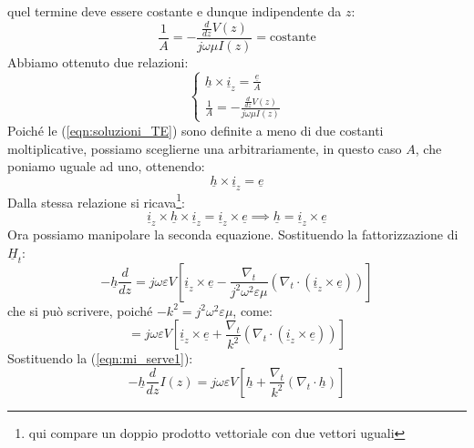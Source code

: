 \documentclass{book}
\begin{document}
        quel termine deve essere costante e dunque indipendente da $z$:
        \begin{equation}
            \frac{1}{A} = \displaystyle -\frac{\frac{d}{dz}V(z)}{j \omega \mu I(z)} =\textrm{costante}
        \end{equation}
        Abbiamo ottenuto due relazioni:
        \begin{equation}
            \begin{cases}
                \displaystyle \underline{h} \times \underline{i}_{z} = \frac{\underline{e}}{A} \\
                \frac{1}{A} = \displaystyle -\frac{\frac{d}{dz}V(z)}{j \omega \mu I(z)}
            \end{cases}
        \end{equation}
        Poiché le (\ref{eqn:soluzioni_TE}) sono definite a meno di due costanti moltiplicative, possiamo sceglierne una arbitrariamente, in questo caso
        $A$, che poniamo uguale ad uno, ottenendo:
        \begin{equation}
            \underline{h} \times \underline{i}_{z} = \underline{e}
        \end{equation}
        Dalla stessa relazione si ricava\footnote{qui compare un doppio prodotto vettoriale con due vettori uguali}:
        \begin{equation}
            \label{eqn:mi_serve1}
            \underline{i}_{z} \times \underline{h} \times \underline{i}_{z} = \underline{i}_{z} \times \underline{e} \implies \underline{h} = \underline{i}_{z} \times \underline{e}
        \end{equation}
        Ora possiamo manipolare la seconda equazione. Sostituendo la fattorizzazione di $\underline{H}_{t}$:
        \begin{equation}
            -\underline{h} \frac{d}{dz} = j \omega \varepsilon V [\underline{i}_{z} \times \underline{e} - \frac{\nabla_{t}}{j^{2}\omega^{2}\varepsilon\mu}(\nabla_{t} \cdot (\underline{i}_{z}\times \underline{e}))]
        \end{equation}
        che si può scrivere, poiché $-k^{2}=j^{2}\omega^{2}\varepsilon\mu$, come:
        \begin{equation}
            = j \omega \varepsilon V [\underline{i}_{z} \times \underline{e} + \frac{\nabla_{t}}{k^{2}}(\nabla_{t}\cdot (\underline{i}_{z} \times \underline{e}))]
        \end{equation}
        Sostituendo la (\ref{eqn:mi_serve1}):
        \begin{equation}
            -\underline{h}\frac{d}{dz}I(z) = j \omega \varepsilon V [ \underline{h} + \frac{\nabla_{t}}{k^{2}}(\nabla_{t} \cdot \underline{h})]
        \end{equation}
\end{document}
